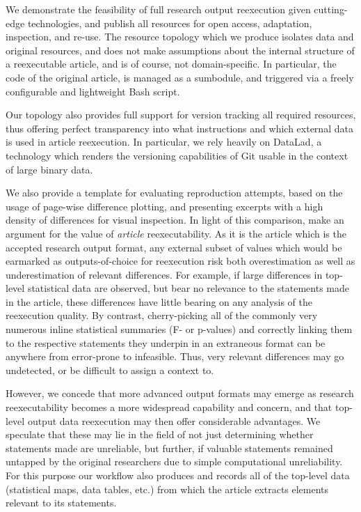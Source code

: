 We demonstrate the feasibility of full research output reexecution given cutting-edge technologies, and publish all resources for open access, adaptation, inspection, and re-use.
The resource topology which we produce isolates data and original resources, and does not make assumptions about the internal structure of a reexecutable article, and is of course, not domain-specific.
In particular, the code of the original article, is managed as a sumbodule, and triggered via a freely configurable and lightweight Bash script.

Our topology also provides full support for version tracking all required resources, thus offering perfect transparency into what instructions and which external data is used in article reexecution.
In particular, we rely heavily on DataLad, a technology which renders the versioning capabilities of Git usable in the context of large binary data.

We also provide a template for evaluating reproduction attempts, based on the usage of page-wise difference plotting, and presenting excerpts with a high density of differences for visual inspection.
In light of this comparison, make an argument for the value of \textit{article} reexecutability.
As it is the article which is the accepted research output format, any external subset of values which would be earmarked as outputs-of-choice for reexecution risk both overestimation as well as underestimation of relevant differences.
For example, if large differences in top-level statistical data are observed, but bear no relevance to the statements made in the article, these differences have little bearing on any analysis of the reexecution quality.
By contrast, cherry-picking all of the commonly very numerous inline statistical summaries (F- or p-values) and correctly linking them to the respective statements they underpin in an extraneous format can be anywhere from error-prone to infeasible.
Thus, very relevant differences may go undetected, or be difficult to assign a context to.

However, we concede that more advanced output formats may emerge as research reexecutability becomes a more widespread capability and concern, and that top-level output data reexecution may then offer considerable advantages.
We speculate that these may lie in the field of not just determining whether statements made are unreliable, but further, if valuable statements remained untapped by the original researchers due to simple computational unreliability.
For this purpose our workflow also produces and records all of the top-level data (statistical maps, data tables, etc.) from which the article extracts elements relevant to its statements.

